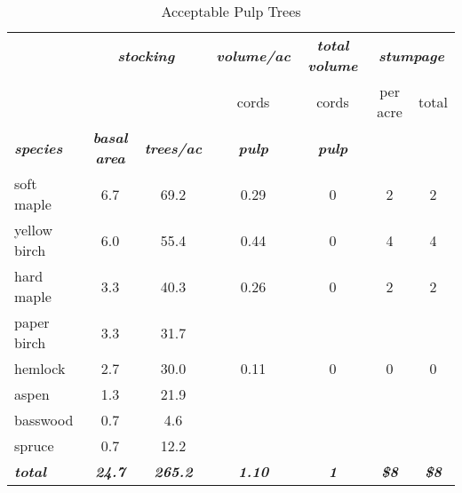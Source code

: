 \documentclass[landscape]{article}
\begin{document}
\begin{table}[H]

\caption{\label{tab:unnamed-chunk-35}Acceptable Pulp Trees}
\fontsize{10}{12}\selectfont
\begin{tabular}[t]{lcccccc}
\toprule
\multicolumn{1}{c}{\em{\textbf{ }}} & \multicolumn{2}{c}{\em{\textbf{stocking}}} & \multicolumn{1}{c}{\em{\textbf{volume/ac }}} & \multicolumn{1}{c}{\em{\textbf{total volume}}} & \multicolumn{2}{c}{\em{\textbf{stumpage}}} \\
\cmidrule(l{3pt}r{3pt}){2-3} \cmidrule(l{3pt}r{3pt}){4-4} \cmidrule(l{3pt}r{3pt}){5-5} \cmidrule(l{3pt}r{3pt}){6-7}
\multicolumn{3}{c}{ } & \multicolumn{1}{c}{cords} & \multicolumn{1}{c}{cords} & \multicolumn{1}{c}{per acre} & \multicolumn{1}{c}{total} \\
\cmidrule(l{3pt}r{3pt}){4-4} \cmidrule(l{3pt}r{3pt}){5-5} \cmidrule(l{3pt}r{3pt}){6-6} \cmidrule(l{3pt}r{3pt}){7-7}
\rowcolor[HTML]{DCDCDC}  \em{\textbf{species}} & \em{\textbf{basal area}} & \em{\textbf{trees/ac}} & \em{\textbf{pulp}} & \em{\textbf{pulp}} & \em{\textbf{ }} & \em{\textbf{ }}\\
\midrule
\rowcolor{gray!6}  soft maple & 6.7 & 69.2 & 0.29 & 0 & 2 & 2\\
 
yellow birch & 6.0 & 55.4 & 0.44 & 0 & 4 & 4\\
 
\rowcolor{gray!6}  hard maple & 3.3 & 40.3 & 0.26 & 0 & 2 & 2\\
 
paper birch & 3.3 & 31.7 &  &  &  & \\
 
\rowcolor{gray!6}  hemlock & 2.7 & 30.0 & 0.11 & 0 & 0 & 0\\
 
aspen & 1.3 & 21.9 &  &  &  & \\
 
\rowcolor{gray!6}  basswood & 0.7 & 4.6 &  &  &  & \\
 
spruce & 0.7 & 12.2 &  &  &  & \\
 
\rowcolor{gray!6}  \rowcolor[HTML]{DCDCDC}  \em{\textbf{total}} & \em{\textbf{24.7}} & \em{\textbf{265.2}} & \em{\textbf{1.10}} & \em{\textbf{1}} & \em{\textbf{\$8}} & \em{\textbf{\$8}}\\
\bottomrule
\end{tabular}
\end{table}
\end{document}
